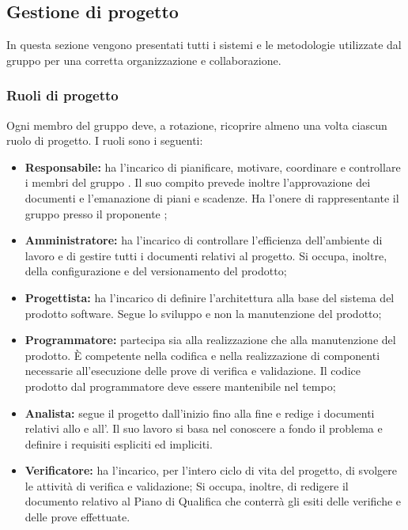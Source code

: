 \subsection{Gestione di progetto}
In questa sezione vengono presentati tutti i sistemi e le metodologie utilizzate dal gruppo per una corretta organizzazione e collaborazione.
\subsubsection{Ruoli di progetto}
Ogni membro del gruppo deve, a rotazione, ricoprire almeno una volta ciascun ruolo di progetto.
I ruoli sono i seguenti:
\begin{itemize}
\item \textbf{Responsabile:} ha l'incarico di pianificare, motivare, coordinare e controllare i membri del gruppo \Gruppo{}.
Il suo compito prevede inoltre l'approvazione dei documenti e l'emanazione di piani e scadenze.
Ha l'onere di rappresentante il gruppo presso il proponente \Proponente{};
\item \textbf{Amministratore:} ha l'incarico di controllare l'efficienza dell'ambiente di lavoro e di gestire tutti i documenti relativi al progetto.
Si occupa, inoltre, della configurazione e del versionamento del prodotto;
\item \textbf{Progettista:} ha l'incarico di definire l'architettura alla base del sistema del prodotto software.
Segue lo sviluppo e non la manutenzione del prodotto;
\item \textbf{Programmatore:} partecipa sia alla realizzazione che alla manutenzione del prodotto.
È competente nella codifica e nella realizzazione di componenti necessarie all’esecuzione delle prove di verifica e validazione.
Il codice prodotto dal programmatore deve essere mantenibile nel tempo;
\item \textbf{Analista:} segue il progetto dall'inizio fino alla fine e redige i documenti relativi allo \SdF{} e all'\AdR{}.
Il suo lavoro si basa nel conoscere a fondo il problema e definire i requisiti espliciti ed impliciti.
\item \textbf{Verificatore:} ha l'incarico, per l'intero ciclo di vita del progetto, di svolgere le attività di verifica e validazione;
Si occupa, inoltre, di redigere il documento relativo al Piano di Qualifica che conterrà gli esiti delle verifiche e delle prove effettuate.
\end{itemize}

